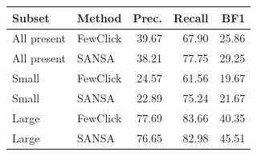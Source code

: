 \par\medskip\noindent\begin{minipage}{\linewidth}
\captionsetup{type=table}
\centering
\caption{Coverage and contour metrics (\%) from saved remote predictions. BF1 uses a $2\,\mu$m boundary tolerance. All values are class-macro averages.}
\label{tab:boundary}
\small
\setlength{\tabcolsep}{4pt}
\begin{tabular}{@{}llrrr@{}}
\toprule
Subset & Method & Prec. & Recall & BF1 \\
\midrule
All present & FewClick & 39.67 & 67.90 & 25.86 \\
All present & SANSA & 38.21 & 77.75 & 29.25 \\
Small & FewClick & 24.57 & 61.56 & 19.67 \\
Small & SANSA & 22.89 & 75.24 & 21.67 \\
Large & FewClick & 77.69 & 83.66 & 40.35 \\
Large & SANSA & 76.65 & 82.98 & 45.51 \\
\bottomrule
\end{tabular}
\end{minipage}\par\medskip
